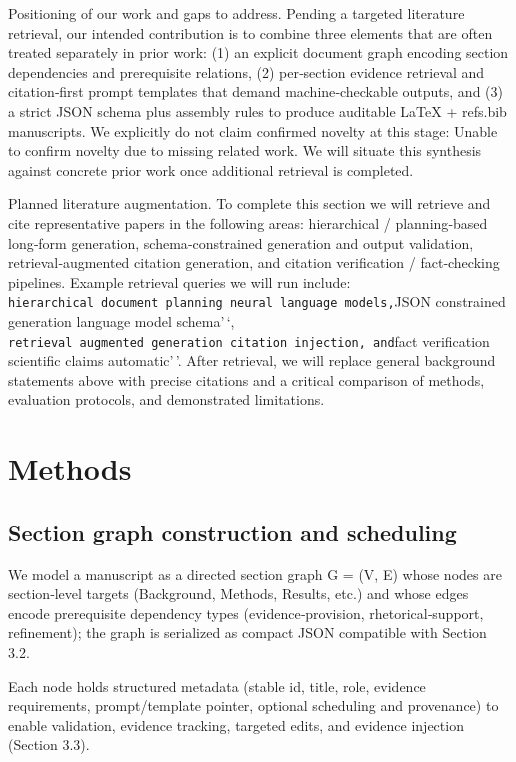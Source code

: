 \documentclass{article}%
\begin{document}
Positioning of our work and gaps to address. Pending a targeted literature retrieval, our intended contribution is to combine three elements that are often treated separately in prior work: (1) an explicit document graph encoding section dependencies and prerequisite relations, (2) per‑section evidence retrieval and citation‑first prompt templates that demand machine‑checkable outputs, and (3) a strict JSON schema plus assembly rules to produce auditable LaTeX + refs.bib manuscripts. We explicitly do not claim confirmed novelty at this stage: Unable to confirm novelty due to missing related work. We will situate this synthesis against concrete prior work once additional retrieval is completed.

Planned literature augmentation. To complete this section we will retrieve and cite representative papers in the following areas: hierarchical / planning‑based long‑form generation, schema‑constrained generation and output validation, retrieval‑augmented citation generation, and citation verification / fact‑checking pipelines. Example retrieval queries we will run include: \texttt{hierarchical\ document\ planning\ neural\ language\ models\textquotesingle{}\textquotesingle{},}JSON constrained generation language model schema'\,`, \texttt{retrieval\ augmented\ generation\ citation\ injection\textquotesingle{}\textquotesingle{},\ and}fact verification scientific claims automatic'\,'. After retrieval, we will replace general background statements above with precise citations and a critical comparison of methods, evaluation protocols, and demonstrated limitations.%

%
\section{Methods}%
\subsection{Section graph construction and scheduling}%


%
We model a manuscript as a directed section graph G = (V, E) whose nodes are section‑level targets (Background, Methods, Results, etc.) and whose edges encode prerequisite dependency types (evidence‑provision, rhetorical‑support, refinement); the graph is serialized as compact JSON compatible with Section 3.2.

Each node holds structured metadata (stable id, title, role, evidence requirements, prompt/template pointer, optional scheduling and provenance) to enable validation, evidence tracking, targeted edits, and evidence injection (Section 3.3).
\end{document}
